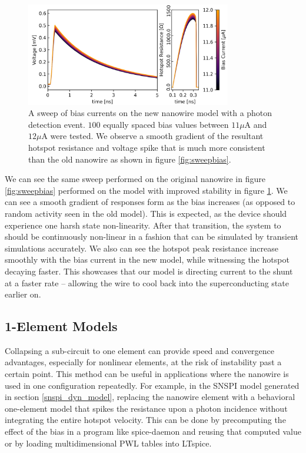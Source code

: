 \begin{figure}
    \centering
    \includegraphics[width=0.8\textwidth]{figs/not_jumbled_mess.png}
    \caption{A sweep of bias currents on the new nanowire model with a photon detection event.
    $100$ equally spaced bias values between $11\mu$A and $12\mu$A were tested. We observe
    a smooth gradient of the resultant
    hotspot resistance and voltage spike that is much more consistent than the old nanowire
    as shown in figure \ref{fig:sweepbias}. 
    }
    \label{fig:not_jumbled_mess}
\end{figure}

We can see the same sweep performed on the original nanowire in figure \ref{fig:sweepbias}
performed on the model with improved stability in figure \ref{fig:not_jumbled_mess}. We can see
a smooth gradient of responses form as the bias increases (as opposed to random activity seen
in the old model). This is expected, as the device should experience one harsh state non-linearity.
After that transition, the system to should be continuously non-linear in a fashion that can be simulated
by transient simulations accurately. We also can see the hotspot peak resistance increase smoothly
with the bias current in the new model, while witnessing the hotspot decaying faster. This showcases
that our model is directing current to the shunt at a faster rate -- allowing the wire to cool back into the
superconducting state earlier on.

\subsection{1-Element Models}

Collapsing a sub-circuit to one element can provide speed and convergence advantages, especially for
nonlinear elements, at the risk of instability past a certain point. This method can be useful in
applications where the nanowire is used in one configuration repeatedly. For example, in the SNSPI
model generated in section \ref{snspi_dyn_model}, replacing the nanowire element with a behavioral
one-element model that spikes the resistance upon a photon incidence without integrating the entire
hotspot velocity. This can be done by precomputing the effect of the bias in a program like spice-daemon
and reusing that computed value or by loading multidimensional PWL tables into LTspice.

